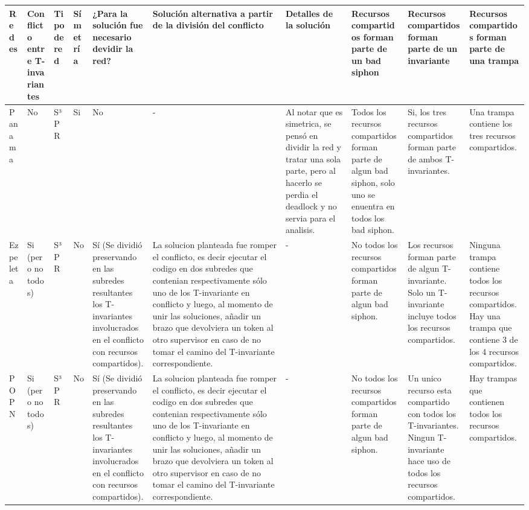 \begin{landscape}
 \begin{table}[H]
    \scriptsize 
    \centering
    \begin{tabular}{|p{1cm}|p{1.5cm}|p{0.7cm}|p{1cm}|p{2cm}|p{4cm}|p{2cm}|p{2cm}|p{2cm}|p{2cm}|}
    \hline
    \textbf{Redes} & \textbf{Conflicto entre T-invariantes} & \textbf{Tipo de red} & \textbf{Símetría} & \textbf{¿Para la solución fue necesario devidir la red?} & \textbf{Solución alternativa a partir de la división del conflicto} & \textbf{Detalles de la solución} & \textbf{Recursos compartidos forman parte de un bad siphon} & \textbf{Recursos compartidos forman parte de un invariante} & \textbf{Recursos compartidos forman parte de una trampa }  \\  \hline
    Panama & No & S³PR & Si & No & - & Al notar que es simetrica, se pensó en dividir la red y tratar una sola parte, pero al hacerlo se perdia el deadlock y no servia para el analisis. & Todos los recursos compartidos forman parte de algun bad siphon, solo uno se enuentra en todos los bad siphon. & Si, los tres recursos compartidos forman parte de ambos T-invariantes. & Una trampa contiene los tres recursos compartidos.  \\ 
    \hline
    
    Ezpeleta & Si (pero no todos) & S³PR & No & Sí (Se dividió preservando en las subredes resultantes los T-invariantes involucrados en el conflicto con recursos compartidos). & La solucion planteada fue romper el conflicto, es decir ejecutar el codigo en dos subredes que contenian respectivamente sólo uno de los T-invariante en conflicto y luego, al momento de unir las soluciones, añadir un brazo que devolviera un token al otro supervisor en caso de no tomar el camino del T-invariante correspondiente. & - & No todos los recursos compartidos forman parte de algun bad siphon. & Los recursos forman parte de algun T-invariante. Solo un T-invariante incluye todos los recursos compartidos. & Ninguna trampa contiene todos los recursos compartidos. Hay una trampa que contiene 3 de los 4 recursos compartidos.  \\ 
    \hline
    
    POPN & Si (pero no todos) & S³PR & No & Sí (Se dividió preservando en las subredes resultantes los T-invariantes involucrados en el conflicto con recursos compartidos). & La solucion planteada fue romper el conflicto, es decir ejecutar el codigo en dos subredes que contenian respectivamente sólo uno de los T-invariante en conflicto y luego, al momento de unir las soluciones, añadir un brazo que devolviera un token al otro supervisor en caso de no tomar el camino del T-invariante correspondiente. & - & No todos los recursos compartidos forman parte de algun bad siphon. & Un unico recurso esta compartido con todos los T-invariantes. Ningun T-invariante hace uso de todos los recursos compartidos. & Hay trampas que contienen todos los recursos compartidos.  \\ 
    \hline
    

\end{tabular}
\end{table}
\end{landscape}
